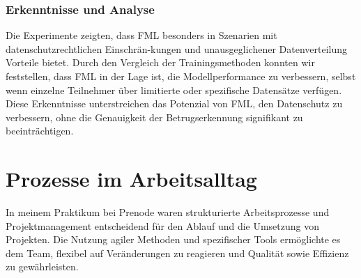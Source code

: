 \documentclass[11pt]{article}
\begin{document}
\subsubsection{Erkenntnisse und Analyse}
Die Experimente zeigten, dass FML besonders in Szenarien mit datenschutzrechtlichen Einschrän-kungen und unausgeglichener Datenverteilung Vorteile bietet. Durch den Vergleich der Trainingsmethoden konnten wir feststellen, dass FML in der Lage ist, die Modellperformance zu verbessern, selbst wenn einzelne Teilnehmer über limitierte oder spezifische Datensätze verfügen. Diese Erkenntnisse unterstreichen das Potenzial von FML, den Datenschutz zu verbessern, ohne die Genauigkeit der Betrugserkennung signifikant zu beeinträchtigen.

\section{Prozesse im Arbeitsalltag}
In meinem Praktikum bei Prenode waren strukturierte Arbeitsprozesse und Projektmanagement entscheidend für den Ablauf und die Umsetzung von Projekten. Die Nutzung agiler Methoden und spezifischer Tools ermöglichte es dem Team, flexibel auf Veränderungen zu reagieren und Qualität sowie Effizienz zu gewährleisten.
\end{document}
